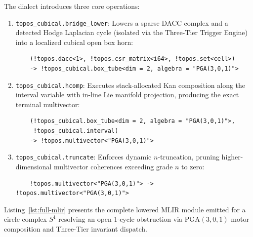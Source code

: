 \documentclass[acmsmall,screen,nonacm]{acmart}
\newcommand{\PGA}{\mathrm{PGA}(3,0,1)}
\begin{document}
The dialect introduces three core operations:
\begin{enumerate}
    \item \texttt{topos\_cubical.bridge\_lower}: Lowers a sparse DACC complex and a detected Hodge Laplacian cycle (isolated via the Three-Tier Trigger Engine) into a localized cubical open box horn:
    \begin{lstlisting}[style=mlircode]
%kan_box = topos_cubical.bridge_lower %K, %L1, %support_cells :
    (!topos.dacc<1>, !topos.csr_matrix<i64>, !topos.set<cell>)
    -> !topos_cubical.box_tube<dim = 2, algebra = "PGA(3,0,1)">
    \end{lstlisting}
    \item \texttt{topos\_cubical.hcomp}: Executes stack-allocated Kan composition along the interval variable with in-line Lie manifold projection, producing the exact terminal multivector:
    \begin{lstlisting}[style=mlircode]
%endpoint_mv = topos_cubical.hcomp %kan_box, %i_one :
    (!topos_cubical.box_tube<dim = 2, algebra = "PGA(3,0,1)">,
     !topos_cubical.interval)
    -> !topos.multivector<"PGA(3,0,1)">
    \end{lstlisting}
    \item \texttt{topos\_cubical.truncate}: Enforces dynamic $n$-truncation, pruning higher-dimensional multivector coherences exceeding grade $n$ to zero:
    \begin{lstlisting}[style=mlircode]
%truncated_mv = topos_cubical.truncate %endpoint_mv {n_dim = 2 : i32} :
    !topos.multivector<"PGA(3,0,1)"> -> !topos.multivector<"PGA(3,0,1)">
    \end{lstlisting}
\end{enumerate}

Listing~\ref{lst:full-mlir} presents the complete lowered MLIR module emitted for a circle complex $S^1$ resolving an open 1-cycle obstruction via $\PGA$ motor composition and Three-Tier invariant dispatch.
\end{document}
